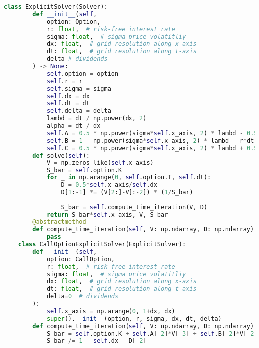 \begin{lstlisting}[language=Python, caption=Explicit solver for Nielsen transformation.]
    class ExplicitSolver(Solver):
        def __init__(self, 
            option: Option,
            r: float,  # risk-free interest rate
            sigma: float,  # sigma price volatitliy
            dx: float,  # grid resolution along x-axis
            dt: float,  # grid resolution along t-axis
            delta # dividends
        ) -> None:
            self.option = option
            self.r = r
            self.sigma = sigma
            self.dx = dx
            self.dt = dt
            self.delta = delta
            lambd = dt / np.power(dx, 2)
            alpha = dt / dx
            self.A = 0.5 * np.power(sigma*self.x_axis, 2) * lambd - 0.5 * self.x_axis * ((r-delta) - (1/dt)) * alpha
            self.B = 1 - np.power(sigma*self.x_axis, 2) * lambd - r*dt
            self.C = 0.5 * np.power(sigma*self.x_axis, 2) * lambd + 0.5 * self.x_axis * ((r-delta) - (1/dt)) * alpha
        def solve(self):
            V = np.zeros_like(self.x_axis)
            S_bar = self.option.K
            for _ in np.arange(0, self.option.T, self.dt):
                D = 0.5*self.x_axis/self.dx
                D[1:-1] *= (V[2:]-V[:-2]) * (1/S_bar)
                
                S_bar = self.compute_time_iteration(V, D)
            return S_bar*self.x_axis, V, S_bar
        @abstractmethod
        def compute_time_iteration(self, V: np.ndarray, D: np.ndarray):
            pass
    class CallOptionExplicitSolver(ExplicitSolver):
        def __init__(self, 
            option: CallOption,
            r: float,  # risk-free interest rate
            sigma: float,  # sigma price volatitliy
            dx: float,  # grid resolution along x-axis
            dt: float,  # grid resolution along t-axis
            delta=0  # dividends
        ):
            self.x_axis = np.arange(0, 1+dx, dx)
            super().__init__(option, r, sigma, dx, dt, delta)
        def compute_time_iteration(self, V: np.ndarray, D: np.ndarray):
            S_bar = self.option.K + self.A[-2]*V[-3] + self.B[-2]*V[-2] + self.C[-2]*V[-1]
            S_bar /= 1 - self.dx - D[-2]
    

\end{lstlisting}
